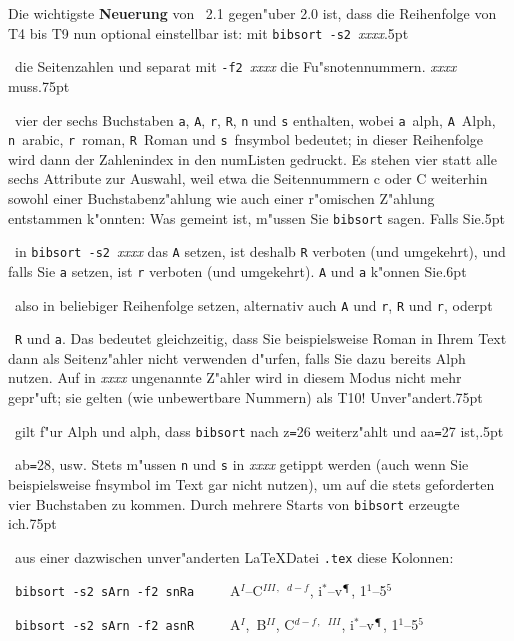 \documentclass[12pt,a4paper]{article}
\newcommand{\pdfko}[1]{\kern #1pt
                          \strut\ignorespaces}%
\begin{document}
\vspace{1ex}\noindent
Die wichtigste \textbf{Neuerung} von \BibArts~2.1 gegen"uber 2.0 ist,
dass die Reihenfolge von \textsf{T4} bis \textsf{T9} nun 
optional einstellbar ist: mit \verb|bibsort|~\verb|-s2|~\textit{xxxx}\pdfko{.5}\ 
die Seitenzahlen und separat mit \verb|-f2|~\textit{xxxx}
die Fu"snotennummern. \textit{xxxx} muss\pdfko{.75}\ 
vier der sechs Buchstaben \verb|a|, \verb|A|, \verb|r|, 
\verb|R|, \verb|n| und \verb|s| enthalten, wobei 
\verb|a|~alph, \verb|A|~Alph, \verb|n|~arabic, 
\verb|r|~roman, \verb|R|~Roman und \verb|s|~fnsymbol bedeutet;
in dieser Reihenfolge wird dann der Zahlenindex in den
num\hy Listen gedruckt. Es stehen vier statt alle sechs
Attribute zur Auswahl, weil etwa die Seitennummern c oder C
weiterhin sowohl einer Buchstabenz"ahlung wie auch einer r"omischen 
Z"ahlung entstammen k"onnten: Was gemeint ist, m"ussen Sie 
\texttt{bibsort} sagen. Falls Sie\pdfko{.5}\  
in \verb|bibsort|~\verb|-s2|~\textit{xxxx} 
das \verb|A| setzen, ist deshalb \verb|R| verboten (und umgekehrt), 
und falls Sie \verb|a| setzen, ist \verb|r| verboten (und umgekehrt).
\verb|A| und \verb|a| k"onnen Sie\pdfko{.6}\ 
also in beliebiger Reihenfolge setzen, 
alternativ auch \verb|A| und \verb|r|, \verb|R| und \verb|r|, oder\pdfko{1}\  
\verb|R| und \verb|a|. Das bedeutet gleichzeitig, dass Sie 
beispielsweise Roman in Ihrem Text dann als Seitenz"ahler nicht verwenden 
d"urfen, falls Sie dazu bereits Alph nutzen. Auf in \textit{xxxx} ungenannte Z"ahler wird 
in diesem Modus nicht mehr gepr"uft; sie gelten (wie unbewertbare Nummern) 
als \textsf{T10}! Unver"andert\pdfko{.75}\ 
gilt f"ur Alph und alph, dass \texttt{bibsort} nach z\texttt{=}26 
weiterz"ahlt und aa\texttt{=}27 ist,\pdfko{.5}\  
ab\texttt{=}28, usw. Stets m"ussen \verb|n| und \verb|s| in \textit{xxxx} 
getippt werden (auch wenn Sie beispielsweise fnsymbol im Text gar nicht 
nutzen), um auf die stets geforderten vier Buchstaben zu kommen. 
Durch mehrere Starts von \texttt{bibsort} erzeugte ich\pdfko{.75}\ 
aus einer dazwischen unver"anderten \LaTeX\hy Datei 
\fabra{...}\texttt{.tex} diese Kolonnen:


\vspace{.75ex}\noindent
\verb| bibsort -s2 sArn -f2 snRa |\abra{...}\verb|    |\textsf{A$^{I}$--C$^{III}$$^{,}$\ $^{d-f}$, i$^{*}$--v$^{\mathparagraph }$, 1$^{1}$--5$^{5}$}

\vspace{.25ex}\noindent
\verb| bibsort -s2 sArn -f2 asnR |\abra{...}\verb|    |\textsf{A$^{I}$,\ B$^{II}$, C$^{d-f}$$^{,}$\ $^{III}$, i$^{*}$--v$^{\mathparagraph }$, 1$^{1}$--5$^{5}$}
\end{document}
